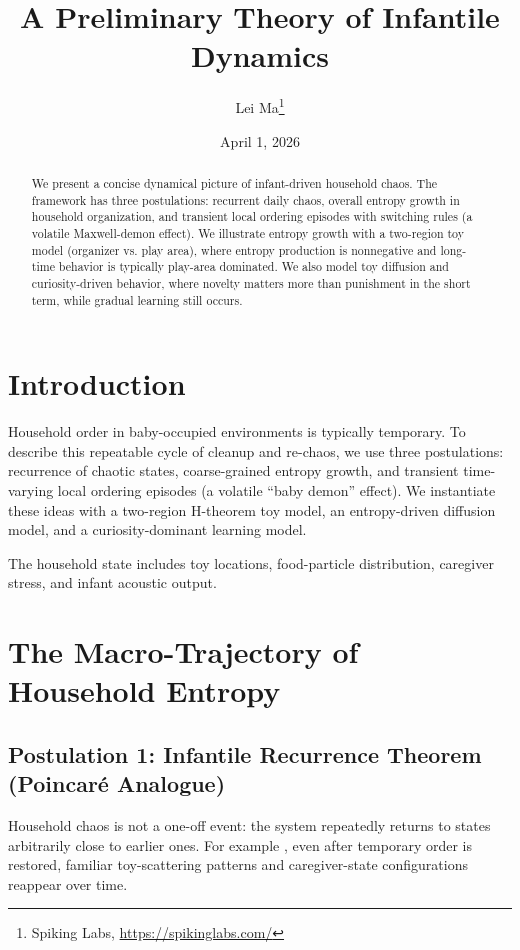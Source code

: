 \documentclass[11pt]{article}
\title{A Preliminary Theory of Infantile Dynamics}
\author{Lei Ma\thanks{Spiking Labs, \url{https://spikinglabs.com/}}}
\date{April 1, 2026}
\begin{document}
\maketitle

\begin{abstract}
We present a concise dynamical picture of infant-driven household chaos. The framework has three postulations: recurrent daily chaos, overall entropy growth in household organization, and transient local ordering episodes with switching rules (a volatile Maxwell-demon effect). We illustrate entropy growth with a two-region toy model (organizer vs. play area), where entropy production is nonnegative and long-time behavior is typically play-area dominated. We also model toy diffusion and curiosity-driven behavior, where novelty matters more than punishment in the short term, while gradual learning still occurs. 
\end{abstract}

\section{Introduction}
Household order in baby-occupied environments is typically temporary. To describe this repeatable cycle of cleanup and re-chaos, we use three postulations: recurrence of chaotic states, coarse-grained entropy growth, and transient time-varying local ordering episodes (a volatile ``baby demon'' effect). We instantiate these ideas with a two-region H-theorem toy model, an entropy-driven diffusion model, and a curiosity-dominant learning model.

The household state includes toy locations, food-particle distribution, caregiver stress, and infant acoustic output.

\section{The Macro-Trajectory of Household Entropy}
\subsection{Postulation 1: Infantile Recurrence Theorem (Poincar\'e Analogue)}

Household chaos is not a one-off event: the system repeatedly returns to states arbitrarily close to earlier ones. For example , even after temporary order is restored, familiar toy-scattering patterns and caregiver-state configurations reappear over time.
\end{document}
